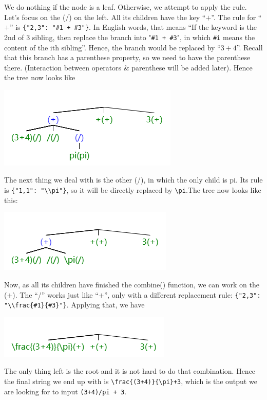 \documentclass[11pt]{article}
\theoremstyle{definition}
\begin{document}
\begin{enumerate}
We do nothing if the node is a leaf. Otherwise, we attempt to apply the rule. Let’s focus on the (/) on the left. All its children have the key “$+$”. The rule for “$+$” is \verb|{"2,3": "#1 + #3"}|. In English words, that means “If the keyword is the 2nd of 3 sibling, then replace the branch into "\verb|#1 + #3|", in which \verb|#i| means the content of the ith sibling”. Hence, the branch would be replaced by “$3+4$”. Recall that this branch has a parenthese property, so we need to have the parenthese there. (Interaction between operators \& parenthese will be added later). Hence the tree now looks like 
\begin{center}
\includegraphics[scale=0.7]{image9.png}
\end{center}
The next thing we deal with is the other (/), in which the only child is pi. Its rule is \verb|{"1,1": "\\pi"}|, so it will be directly replaced by \verb|\pi|.The tree now looks like this: 
\begin{center}
\includegraphics[scale=0.7]{image11.png}
\end{center}
Now, as all its children have finished the combine() function, we can work on the ($+$). The “/” works just like “$+$”, only with a different replacement rule: \verb|{"2,3": "\\frac{#1}{#3}"}|. Applying that, we have
\begin{center}
\includegraphics[scale=0.7]{image6.png}
\end{center}
The only thing left is the root and it is not hard to do that combination. Hence the final string we end up with is \verb|\frac{(3+4)}{\pi}+3|, which is the output we are looking for to input \verb|(3+4)/pi + 3|. \\


\end{enumerate}
\end{document}
